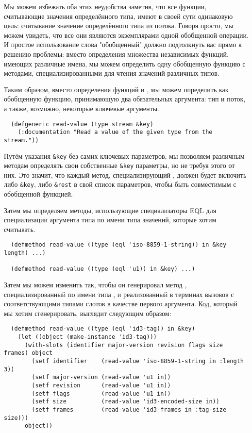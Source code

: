 Мы можем избежать оба этих неудобства заметив, что все функции, считывающие значения
определённого типа, имеют в своей сути одинаковую цель: считывание значение определённого
типа из потока. Говоря просто, мы можем увидеть, что все они являются экземплярами одной
обобщенной операции. И простое использование слова "обобщенный" должно подтолкнуть вас
прямо к решению проблемы: вместо определения множества независимых функций, имеющих
различные имена, мы можем определить одну обобщенную функцию  с методами,
специализированными для чтения значений различных типов.

Таким образом, вместо определения функций  и ,
мы можем определить  как обобщенную функцию, принимающую два обязательных
аргумента: тип и поток, а также, возможно, некоторые ключевые аргументы.

\begin{lstlisting}
  (defgeneric read-value (type stream &key)
    (:documentation "Read a value of the given type from the stream."))
\end{lstlisting}

Путём указания \lstinline!&key! без самих ключевых параметров, мы позволяем различным
методам определять свои собственные \lstinline!&key! параметры, но не требуя этого от
них. Это значит, что каждый метод, специализирующий , должен будет
включить либо \lstinline!&key!, либо \lstinline!&rest! в свой список параметров, чтобы
быть совместимым с обобщенной функцией.

Затем мы определяем методы, использующие специализаторы EQL для специализации аргумента
типа по имени типа значений, которые хотим считывать.

\begin{lstlisting}
  (defmethod read-value ((type (eql 'iso-8859-1-string)) in &key length) ...)

  (defmethod read-value ((type (eql 'u1)) in &key) ...)
\end{lstlisting}

Затем мы можем изменить так, чтобы он генерировал метод
, специализированный по имени типа , и реализованный в
терминах вызовов  с соответствующими типами слотов в качестве первого
аргумента. Код, который мы хотим сгенерировать, выглядит следующим образом:

\begin{lstlisting}
  (defmethod read-value ((type (eql 'id3-tag)) in &key)
    (let ((object (make-instance 'id3-tag)))
      (with-slots (identifier major-version revision flags size frames) object
        (setf identifier    (read-value 'iso-8859-1-string in :length 3))
        (setf major-version (read-value 'u1 in))
        (setf revision      (read-value 'u1 in))
        (setf flags         (read-value 'u1 in))
        (setf size          (read-value 'id3-encoded-size in))
        (setf frames        (read-value 'id3-frames in :tag-size size)))
      object))
\end{lstlisting}

